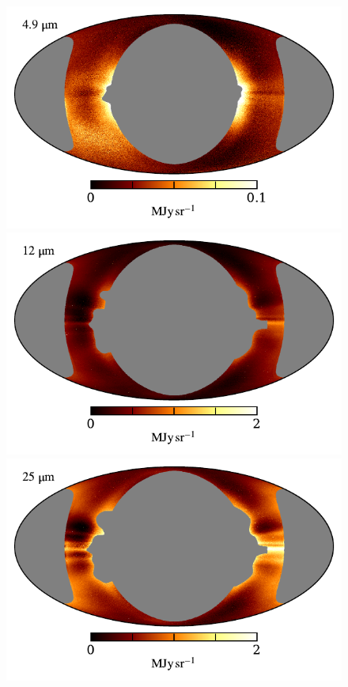 \documentclass{aa}
\begin{document}
\begin{figure}
  \centering
  \includegraphics[width=0.83\columnwidth]{figs/mean_solar_04.pdf}\hspace*{5mm}
  \includegraphics[width=0.83\columnwidth]{figs/mean_solar_05.pdf}\\\vspace*{-2mm}
  \includegraphics[width=0.83\columnwidth]{figs/mean_solar_06.pdf}\hspace*{5mm}

\end{figure}
\end{document}
